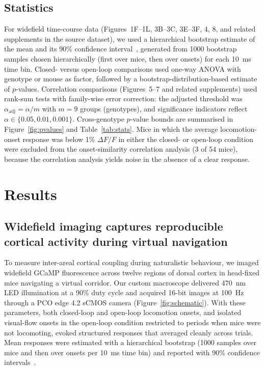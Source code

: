 \documentclass[11pt]{article}
\begin{document}
\subsection{Statistics}
For widefield time-course data (Figures~1F--1L, 3B--3C, 3E--3F, 4, 8, and related supplements in the source dataset), we used a hierarchical bootstrap estimate of the mean and its 90\% confidence interval~\citep{saravanan2020hierarchical}, generated from 1000 bootstrap samples chosen hierarchically (first over mice, then over onsets) for each 10~ms time bin. Closed- versus open-loop comparisons used one-way ANOVA with genotype or mouse as factor, followed by a bootstrap-distribution-based estimate of $p$-values. Correlation comparisons (Figures~5--7 and related supplements) used rank-sum tests with family-wise error correction: the adjusted threshold was $\alpha_{\mathrm{adj}} = \alpha / m$ with $m = 9$ groups (genotypes), and significance indicators reflect $\alpha \in \{0.05, 0.01, 0.001\}$. Cross-genotype $p$-value bounds are summarised in Figure~\ref{fig:pvalues} and Table~\ref{tab:stats}. Mice in which the average locomotion-onset response was below 1\% $\Delta F / F$ in either the closed- or open-loop condition were excluded from the onset-similarity correlation analysis (3 of 54 mice), because the correlation analysis yields noise in the absence of a clear response.

\section{Results}

\subsection{Widefield imaging captures reproducible cortical activity during virtual navigation}

To measure inter-areal cortical coupling during naturalistic behaviour, we imaged widefield GCaMP fluorescence across twelve regions of dorsal cortex in head-fixed mice navigating a virtual corridor. Our custom macroscope delivered 470~nm LED illumination at a 90\% duty cycle and acquired 16-bit images at 100~Hz through a PCO edge 4.2 sCMOS camera (Figure~\ref{fig:schematic}). With these parameters, both closed-loop and open-loop locomotion onsets, and isolated visual-flow onsets in the open-loop condition restricted to periods when mice were not locomoting, evoked structured responses that averaged cleanly across trials. Mean responses were estimated with a hierarchical bootstrap (1000 samples over mice and then over onsets per 10~ms time bin) and reported with 90\% confidence intervals~\citep{saravanan2020hierarchical}.
\end{document}
